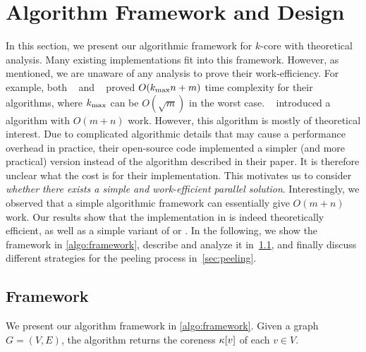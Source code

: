 \section{Algorithm Framework and Design}\label{sec:alg}
In this section, we present our algorithmic framework for $k$-core with theoretical analysis. 
Many existing implementations fit into this framework. 
However, as mentioned, we are unaware of any analysis to prove their work-efficiency. 
For example, both \ParK~\cite{dasari2014park} and \PKC~\cite{kabir2017parallel} proved $O({k_{\max}} n+m)$ time complexity for their algorithms, 
where ${k_{\max}}$ can be $O(\sqrt{m})$ in the worst case. 
\Julienne{}~\cite{dhulipala2017} introduced a \kcore{} algorithm with $O(m+n)$ work. 
However, this algorithm is mostly of theoretical interest.
Due to complicated algorithmic details that may cause a performance overhead in practice, 
their open-source code implemented a simpler (and more practical) version instead of the algorithm described in their paper.
It is therefore unclear what the cost is for their implementation. 
This motivates us to consider \emph{whether there exists a simple and work-efficient parallel \kcore{} solution}. 
Interestingly, we observed that a simple algorithmic framework can essentially give $O(m+n)$ work. 
Our results show that the implementation in \Julienne{} is indeed theoretically efficient, as well as a simple variant of \Park{} or \PKC{}. 
In the following, we show the framework in \cref{algo:framework}, describe and analyze it in~\cref{sec:framework}, and finally discuss different strategies for the peeling process in~\cref{sec:peeling}. 





\subsection{Framework}\label{sec:framework}


We present our algorithm framework in \cref{algo:framework}.
Given a graph $G=(V,E)$, the algorithm returns the coreness ${\kappa}[v]$ of each $v\in V$.

